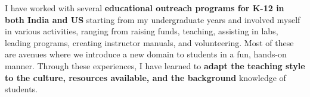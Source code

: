 \documentclass[10pt]{article}
\begin{document}
I have worked with several \textbf{educational outreach programs for K-12 in both India and US} starting from my undergraduate years and involved myself in various activities, ranging from raising funds, teaching, assisting in labs, leading programs, creating instructor manuals, and volunteering. Most of these are avenues where we introduce a new domain to students in a fun, hands-on manner. Through these experiences, I have learned to \textbf{adapt the teaching style to the culture, resources available, and the background} knowledge of students. \\


\end{document}
